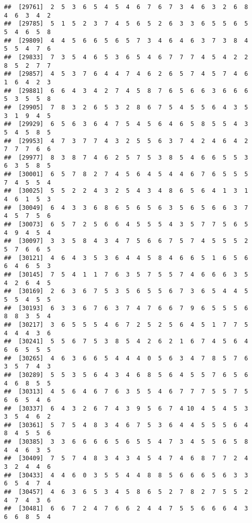 \documentclass[
]{book}
\begin{document}
\begin{verbatim}
##  [29761]  2  5  3  6  5  4  5  4  6  7  6  7  3  4  6  3  2  6  8  4  6  3  4  2
##  [29785]  5  1  5  2  3  7  4  5  6  5  2  6  3  3  6  5  5  6  5  5  4  6  5  8
##  [29809]  4  4  5  6  6  5  6  5  7  3  4  6  4  6  3  7  3  8  4  5  5  4  7  6
##  [29833]  7  3  5  4  6  5  3  6  5  4  6  7  7  7  4  5  4  2  2  8  5  2  7  7
##  [29857]  4  5  3  7  6  4  4  7  4  6  2  6  5  7  4  5  7  4  6  1  6  4  2  3
##  [29881]  6  6  4  3  4  2  7  4  5  8  7  6  5  6  6  3  6  6  6  5  3  5  5  8
##  [29905]  7  8  3  2  6  5  3  2  8  6  7  5  4  5  5  6  4  3  5  3  1  9  4  5
##  [29929]  6  5  6  3  6  4  7  5  4  5  6  4  6  5  8  5  5  4  3  5  4  5  8  5
##  [29953]  4  7  3  7  7  4  3  2  5  5  6  3  7  4  2  4  6  4  2  7  7  7  6  6
##  [29977]  8  3  8  7  4  6  2  5  7  5  3  8  5  4  6  6  5  5  3  6  3  5  8  5
##  [30001]  6  5  7  8  2  7  4  5  6  4  5  4  4  6  7  6  5  5  5  7  4  5  5  4
##  [30025]  5  5  2  2  4  3  2  5  4  3  4  8  6  5  6  4  1  3  1  4  6  1  5  3
##  [30049]  6  4  3  3  6  8  6  5  6  5  6  3  5  6  5  6  6  3  7  4  5  7  5  6
##  [30073]  6  5  7  2  5  6  6  4  5  5  5  4  3  5  7  7  5  6  5  4  9  4  5  4
##  [30097]  3  3  5  8  4  3  4  7  5  6  6  7  5  7  4  5  5  5  2  5  7  6  6  5
##  [30121]  4  6  4  3  5  3  6  4  4  5  8  4  6  6  5  1  6  5  6  6  4  6  5  3
##  [30145]  7  5  4  1  1  7  6  3  5  7  5  5  7  4  6  6  6  3  5  4  2  6  4  5
##  [30169]  2  6  3  6  7  5  3  5  6  5  5  6  7  3  6  5  4  4  5  5  5  4  5  5
##  [30193]  6  3  3  6  7  6  3  7  4  7  6  6  7  9  6  5  5  5  6  8  8  3  5  4
##  [30217]  3  6  5  5  5  4  6  7  2  5  2  5  6  4  5  1  7  7  5  4  4  4  3  6
##  [30241]  5  5  6  7  5  3  8  5  4  2  6  2  1  6  7  4  5  6  4  6  6  5  5  5
##  [30265]  4  6  3  6  6  5  4  4  4  0  5  6  3  4  7  8  5  7  6  3  5  7  4  3
##  [30289]  5  5  3  5  6  4  3  4  6  8  5  6  4  5  5  7  6  5  6  4  6  8  5  5
##  [30313]  4  5  6  4  6  7  6  3  5  5  4  6  7  7  7  5  5  7  5  6  6  5  4  6
##  [30337]  6  4  3  2  6  7  4  3  9  5  6  7  4 10  4  5  4  5  3  3  5  4  6  2
##  [30361]  5  7  5  4  8  3  4  6  7  5  3  6  4  4  5  5  5  6  4  8  4  5  5  6
##  [30385]  3  3  6  6  6  6  5  6  5  5  4  7  3  4  5  5  6  5  8  4  4  6  3  5
##  [30409]  7  5  7  4  8  3  4  3  4  5  4  7  4  6  8  7  7  2  4  3  2  4  4  6
##  [30433]  4  4  6  0  3  5  5  4  4  8  8  5  6  6  6  5  6  3  3  6  5  4  7  4
##  [30457]  4  6  3  6  5  3  4  5  8  6  5  2  7  8  2  7  5  5  2  4  7  4  3  6
##  [30481]  6  6  7  2  4  7  6  6  2  4  4  7  5  5  6  6  6  4  3  6  6  8  5  4

\end{verbatim}
\end{document}
